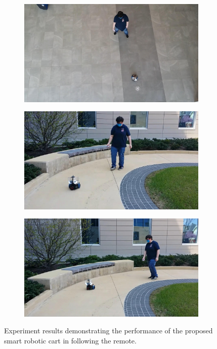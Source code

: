 \documentclass[conference]{IEEEtran}
\begin{document}
\begin{figure}[htbp]
\begin{subfigure}[b]{0.24\linewidth}
    \caption{}
    \label{fig:491}
  \end{subfigure}
  \begin{subfigure}[b]{0.24\linewidth}
    \centering
    \includegraphics[width=\textwidth]{videos/frames/561.jpeg} 
    \caption{}
    \label{fig:561}
  \end{subfigure}
  \begin{subfigure}[b]{0.24\linewidth}
    \centering
    \includegraphics[width=\textwidth]{videos/frames/631.jpeg} 
    \caption{}
    \label{fig:631}
  \end{subfigure}
  \begin{subfigure}[b]{0.24\linewidth}
    \centering
    \includegraphics[width=\textwidth]{videos/frames/701.jpeg} 
    \caption{}
    \label{fig:701}
  \end{subfigure}
  \caption{Experiment results demonstrating the performance of the proposed smart robotic cart in following the remote.}
  \label{fig:experResultsImages}
\end{figure}
\end{document}
